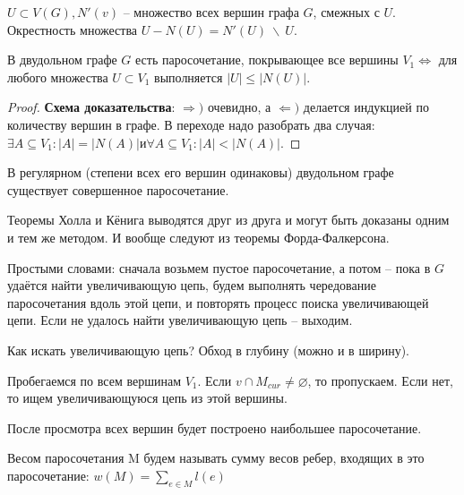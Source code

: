 	\begin{Def}
		$U \subset V(G), N'(v)$ -- множество всех вершин графа $G$, смежных с $U$. Окрестность множества $U - N(U) = N'(U) \ \backslash \ U$.
	\end{Def}

	\begin{Thm}[Холл, 1935]
		В двудольном графе $G$ есть паросочетание, покрывающее все вершины $V_1 \Leftrightarrow$ для любого множества $U \subset V_1$ выполняется $|U| \leqslant |N(U)|$.
	\end{Thm}	

	\begin{proof}
		\textbf{Схема доказательства}: $\Rightarrow)$ очевидно, а $\Leftarrow)$ делается индукцией по количеству вершин в графе. В переходе надо разобрать два случая:
		$\exists A \subseteq V_1 : |A| = |N(A)| и \forall A \subseteq V_1: |A| < |N(A)|$.
	\end{proof}

	\begin{Cons}[Кёниг]
		В регулярном (степени всех его вершин одинаковы) двудольном графе существует совершенное паросочетание.
	\end{Cons}

	\begin{Rem}
		Теоремы Холла и Кёнига выводятся друг из друга и могут быть доказаны одним и тем же методом. 
		И вообще следуют из теоремы Форда-Фалкерсона.
	\end{Rem}


	Простыми словами: сначала возьмем пустое паросочетание, а потом -- пока в $G$ удаётся найти увеличивающую цепь, будем выполнять чередование паросочетания вдоль этой цепи, и повторять процесс поиска увеличивающей цепи. 
	Если не удалось найти увеличивающую цепь -- выходим. 
	
	Как искать увеличивающую цепь? Обход в глубину (можно и в ширину).

	Пробегаемся по всем вершинам $V_1$. Если $v \cap M_{cur} \neq \varnothing$, то пропускаем. Если нет, то ищем увеличивающуюся цепь из этой вершины.

	После просмотра всех вершин будет построено наибольшее паросочетание.
	
	\def\AuthorName{Ксения Кузьмина}

	\begin{Def} 
		Весом паросочетания M будем называть сумму весов ребер, входящих в это паросочетание:
		$w(M) = \sum_{e \in M} l(e)$
	\end{Def} 

